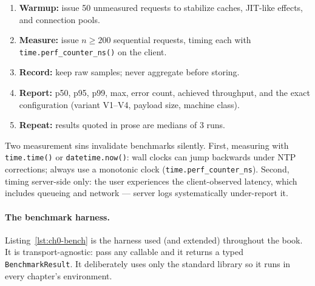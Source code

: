 \begin{enumerate}
  \item \textbf{Warmup:} issue 50 unmeasured requests to stabilize caches,
        JIT-like effects, and connection pools.
  \item \textbf{Measure:} issue $n \geq 200$ sequential requests, timing each
        with \texttt{time.perf\_counter\_ns()} on the client.
  \item \textbf{Record:} keep raw samples; never aggregate before storing.
  \item \textbf{Report:} p50, p95, p99, max, error count, achieved
        throughput, and the exact configuration (variant V1--V4, payload
        size, machine class).
  \item \textbf{Repeat:} results quoted in prose are medians of 3 runs.
\end{enumerate}

\begin{warningbox}
Two measurement sins invalidate benchmarks silently. First, measuring with
\texttt{time.time()} or \texttt{datetime.now()}: wall clocks can jump
backwards under NTP corrections; always use a monotonic clock
(\texttt{time.perf\_counter\_ns}). Second, timing server-side only: the user
experiences the client-observed latency, which includes queueing and network
--- server logs systematically under-report it.
\end{warningbox}

\paragraph{The benchmark harness.}
Listing~\ref{lst:ch0-bench} is the harness used (and extended) throughout the
book. It is transport-agnostic: pass any callable and it returns a typed
\texttt{BenchmarkResult}. It deliberately uses only the standard library so
it runs in every chapter's environment.


